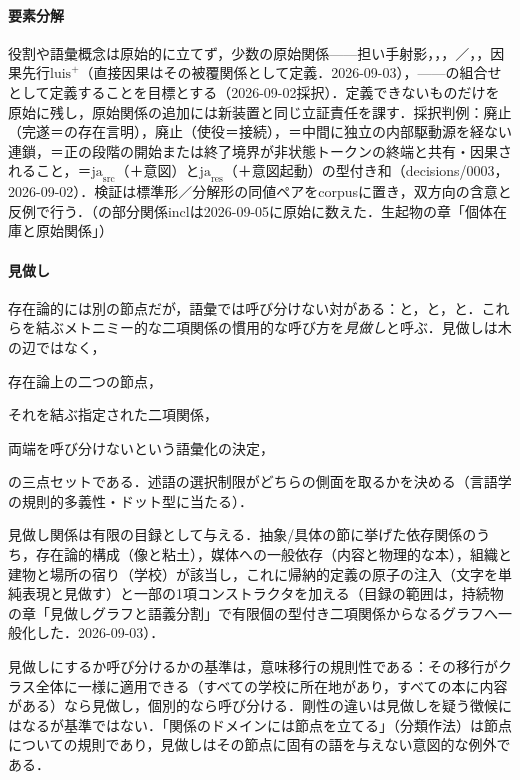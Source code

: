 \documentclass[../../main-detail.tex]{subfiles}
\begin{document}
\paragraph{要素分解} 役割や語彙概念は原始的に立てず，少数の原始関係——担い手射影，，，／，，因果先行$\mathrm{luis}^{+}$（直接因果はその被覆関係として定義．2026-09-03），——の組合せとして定義することを目標とする（2026-09-02採択）．定義できないものだけを原始に残し，原始関係の追加には新装置と同じ立証責任を課す．採択判例：廃止（完遂＝の存在言明），廃止（使役＝接続），＝中間に独立の内部駆動源を経ない連鎖，＝正の段階の開始または終了境界が非状態トークンの終端と共有・因果されること，＝$\mathrm{ja}_{\mathrm{src}}$（＋意図）と$\mathrm{ja}_{\mathrm{res}}$（＋意図起動）の型付き和（decisions/0003，2026-09-02）．検証は標準形／分解形の同値ペアをcorpusに置き，双方向の含意と反例で行う．（の部分関係$\mathrm{incl}$は2026-09-05に原始に数えた．生起物の章「個体在庫と原始関係」）

\paragraph{見做し} 存在論的には別の節点だが，語彙では呼び分けない対がある：と，と，と．これらを結ぶメトニミー的な二項関係の慣用的な呼び方を\emph{見做し}と呼ぶ．見做しは木の辺ではなく，
\begin{enumerate*}
    \item 存在論上の二つの節点，
    \item それを結ぶ指定された二項関係，
    \item 両端を呼び分けないという語彙化の決定，
\end{enumerate*}
の三点セットである．述語の選択制限がどちらの側面を取るかを決める（言語学の規則的多義性・ドット型に当たる）．

見做し関係は有限の目録として与える．抽象/具体の節に挙げた依存関係のうち，存在論的構成（像と粘土），媒体への一般依存（内容と物理的な本），組織と建物と場所の宿り（学校）が該当し，これに帰納的定義の原子の注入（文字を単純表現と見做す）と一部の1項コンストラクタを加える（目録の範囲は，持続物の章「見做しグラフと語義分割」で有限個の型付き二項関係からなるグラフへ一般化した．2026-09-03）．

見做しにするか呼び分けるかの基準は，意味移行の規則性である：その移行がクラス全体に一様に適用できる（すべての学校に所在地があり，すべての本に内容がある）なら見做し，個別的なら呼び分ける．剛性の違いは見做しを疑う徴候にはなるが基準ではない．「関係のドメインには節点を立てる」（分類作法）は節点についての規則であり，見做しはその節点に固有の語を与えない意図的な例外である．
\end{document}
